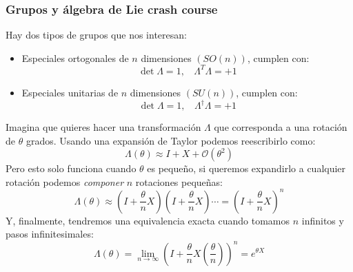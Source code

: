 \documentclass[]{article}
\numberwithin{equation}{section}
\begin{document}
\subsubsection{Grupos y álgebra de Lie crash course \label{seccion_LIE}}
Hay dos tipos de grupos que nos interesan:
\begin{itemize}
	\item Especiales ortogonales de \(n\) dimensiones \((SO(n))\), cumplen con:
	\begin{equation}
		\det{\Lambda} = 1,\ \ \ \ \Lambda^T\Lambda = +1
	\end{equation}
	\item Especiales unitarias de \(n\) dimensiones \((SU(n))\), cumplen con:
	\begin{equation}
		\det{\Lambda} = 1,\ \ \ \ \Lambda^\dagger\Lambda = +1
	\end{equation}
\end{itemize}


Imagina que quieres hacer una transformación \(\Lambda\) que corresponda a una rotación de \(\theta\) grados. Usando una expansión de Taylor podemos reescribirlo como:
\begin{equation*}
	\Lambda(\theta)\approx I + X + \mathcal{O}(\theta^2)
\end{equation*}
Pero esto solo funciona cuando \(\theta\) es pequeño, si queremos expandirlo a cualquier rotación podemos \textit{componer} \(n\) rotaciones pequeñas:
\begin{equation*}
	\Lambda(\theta)\approx \left(I + \frac{\theta}{n}X\right)\left(I + \frac{\theta}{n}X\right)\cdots = \left(I + \frac{\theta}{n}X\right)^n
\end{equation*}
Y, finalmente, tendremos una equivalencia exacta cuando tomamos \(n\) infinitos y pasos infinitesimales:
\begin{equation}
	\Lambda(\theta) = \lim_{n\rightarrow\infty}\left(I + \frac{\theta}{n}X(\frac{\theta}{n})\right)^n = e^{\theta X}
	\label{eqn:map_gem_trans}
\end{equation}

\end{document}
